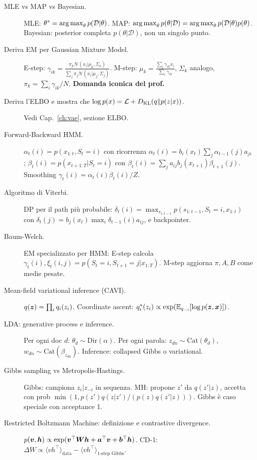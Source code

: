 \begin{description}
  \item[MLE vs MAP vs Bayesian.] MLE: $\theta^* = \operatorname*{arg\,max}_\theta p(\mathcal{D}|\theta)$. MAP: $\operatorname*{arg\,max}_\theta p(\theta|\mathcal{D}) = \operatorname*{arg\,max}_\theta p(\mathcal{D}|\theta)p(\theta)$. Bayesian: posterior completa $p(\theta|\mathcal{D})$, non un singolo punto.
  \item[Deriva EM per Gaussian Mixture Model.] E-step: $\gamma_{ik} = \frac{\pi_k \mathcal{N}(x_i|\mu_k,\Sigma_k)}{\sum_j \pi_j \mathcal{N}(x_i|\mu_j, \Sigma_j)}$. M-step: $\mu_k = \frac{\sum_i \gamma_{ik} x_i}{\sum_i \gamma_{ik}}$, $\Sigma_k$ analogo, $\pi_k = \sum_i\gamma_{ik}/N$. \textbf{Domanda iconica del prof.}
  \item[Deriva l'ELBO e mostra che $\log p(x) = \mathcal{L} + D_{\mathrm{KL}}\!\left(q \| p(z|x)\right)$.] Vedi Cap.~\ref{ch:vae}, sezione ELBO.
  \item[Forward-Backward HMM.] $\alpha_t(i) = p(x_{1:t}, S_t=i)$ con ricorrenza $\alpha_t(i) = b_i(x_t) \sum_j \alpha_{t-1}(j) a_{ji}$; $\beta_t(i) = p(x_{t+1:T}|S_t=i)$ con $\beta_t(i) = \sum_j a_{ij} b_j(x_{t+1}) \beta_{t+1}(j)$. Smoothing $\gamma_t(i) = \alpha_t(i)\beta_t(i)/Z$.
  \item[Algoritmo di Viterbi.] DP per il path più probabile: $\delta_t(i) = \max_{s_{1:t-1}} p(s_{1:t-1}, S_t=i, x_{1:t})$ con $\delta_t(j) = b_j(x_t) \max_i \delta_{t-1}(i) a_{ij}$, e backpointer.
  \item[Baum-Welch.] EM specializzato per HMM: E-step calcola $\gamma_t(i), \xi_t(i,j) = p(S_t=i, S_{t+1}=j|x_{1:T})$. M-step aggiorna $\pi, A, B$ come medie pesate.
  \item[Mean-field variational inference (CAVI).] $q(\bm{z}) = \prod_i q_i(z_i)$. Coordinate ascent: $q_i^*(z_i) \propto \exp(\mathbb{E}_{q_{-i}}[\log p(\bm{z}, \bm{x})])$.
  \item[LDA: generative process e inference.] Per ogni doc $d$: $\theta_d \sim \mathrm{Dir}(\alpha)$. Per ogni parola: $z_{dn} \sim \mathrm{Cat}(\theta_d)$, $w_{dn} \sim \mathrm{Cat}(\beta_{z_{dn}})$. Inference: collapsed Gibbs o variational.
  \item[Gibbs sampling vs Metropolis-Hastings.] Gibbs: campiona $z_i | z_{-i}$ in sequenza. MH: propone $z'$ da $q(z'|z)$, accetta con prob $\min(1, p(z')q(z|z')/(p(z)q(z'|z)))$. Gibbs è caso speciale con acceptance 1.
  \item[Restricted Boltzmann Machine: definizione e contrastive divergence.] $p(\bm{v},\bm{h}) \propto \exp(\bm{v}^\top \bm{W}\bm{h} + \bm{a}^\top\bm{v} + \bm{b}^\top \bm{h})$. CD-1: $\Delta W \propto \langle vh^\top\rangle_{\text{data}} - \langle vh^\top \rangle_{\text{1-step Gibbs}}$.
\end{description}

